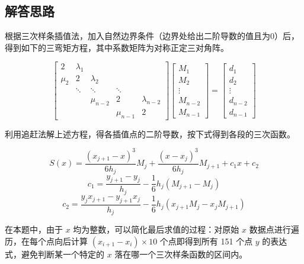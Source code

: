 \documentclass{ctexart}
\begin{document}
\subsection{解答思路}
根据三次样条插值法，加入自然边界条件（边界处给出二阶导数的值且为0）后，得到如下的三弯矩方程，其中系数矩阵为对称正定三对角阵。

\[
\left[ \begin{array}{ccccc}
{2} & {\lambda_{1}} & & & \\
{\mu_{2}} & {2} & {\lambda_{2}} & { } & { } \\
{ } & {\ddots} & {\ddots} & {\ddots} & { } \\
{ } & { } & {\mu_{n-2}} & {2} & {\lambda_{n-2}} \\
{ } & { } & { } & {\mu_{n-1}} & {2}
\end{array}\right]
\left[ \begin{array}{c}{M_{1}} \\ {M_{2}} \\ {\vdots} \\ {M_{n-2}} \\ {M_{n-1}}\end{array}\right]
=
\left[ \begin{array}{c}{d_{1}} \\ {d_{2}} \\ {\vdots} \\ {d_{n-2}} \\ {d_{n-1}}\end{array}\right]
\]

利用追赶法解上述方程，得各插值点的二阶导数，按下式得到各段的三次函数。

\[
S(x)=\frac{\left(x_{j+1}-x\right)^{3}}{6 h_{j}} M_{j}+\frac{\left(x-x_{j}\right)^{3}}{6 h_{j}} M_{j+1}+c_{1} x+c_{2}
\]
\[
c_{1}=\frac{y_{j+1}-y_{j}}{h_{j}}-\frac{1}{6} h_{j}\left(M_{j+1}-M_{j}\right)
\]
\[
c_{2}=\frac{y_{j} x_{j+1}-y_{j+1} x_{j}}{h_{j}}-\frac{1}{6} h_{j}\left(x_{j+1} M_{j}-x_{j} M_{j+1}\right)
\]

在本题中，由于 $x$ 均为整数，可以简化最后求值的过程：对原始 $x$ 数据点进行遍历，在每个点向后计算 $(x_{i+1}-x_i)\times 10$ 个点即得到所有 151 个点 $y$ 的表达式，避免判断某一个特定的 $x$ 落在哪一个三次样条函数的区间内。
\end{document}
